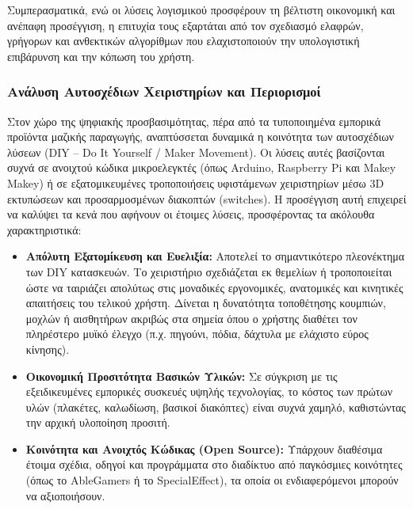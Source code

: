 \documentclass[twoside, a4paper, 11pt]{article}
\newcommand{\textlatin}[1]{\textenglish{#1}}
\begin{document}
Συμπερασματικά, ενώ οι λύσεις λογισμικού προσφέρουν τη βέλτιστη οικονομική και ανέπαφη προσέγγιση, η επιτυχία τους εξαρτάται από τον σχεδιασμό ελαφρών, γρήγορων και ανθεκτικών αλγορίθμων που ελαχιστοποιούν την υπολογιστική επιβάρυνση και την κόπωση του χρήστη.

\subsubsection{Ανάλυση Αυτοσχέδιων Χειριστηρίων και Περιορισμοί}

Στον χώρο της ψηφιακής προσβασιμότητας, πέρα από τα τυποποιημένα εμπορικά προϊόντα μαζικής παραγωγής, αναπτύσσεται δυναμικά η κοινότητα των αυτοσχέδιων λύσεων (\textlatin{DIY -- Do It Yourself / Maker Movement}). Οι λύσεις αυτές βασίζονται συχνά σε ανοιχτού κώδικα μικροελεγκτές (όπως \textlatin{Arduino, Raspberry Pi} και \textlatin{Makey Makey}) ή σε εξατομικευμένες τροποποιήσεις υφιστάμενων χειριστηρίων μέσω \textlatin{3D} εκτυπώσεων και προσαρμοσμένων διακοπτών (\textlatin{switches}). Η προσέγγιση αυτή επιχειρεί να καλύψει τα κενά που αφήνουν οι έτοιμες λύσεις, προσφέροντας τα ακόλουθα χαρακτηριστικά:

\begin{itemize}
    \item \textbf{Απόλυτη Εξατομίκευση και Ευελιξία:} Αποτελεί το σημαντικότερο πλεονέκτημα των \textlatin{DIY} κατασκευών. Το χειριστήριο σχεδιάζεται εκ θεμελίων ή τροποποιείται ώστε να ταιριάζει απολύτως στις μοναδικές εργονομικές, ανατομικές και κινητικές απαιτήσεις του τελικού χρήστη. Δίνεται η δυνατότητα τοποθέτησης κουμπιών, μοχλών ή αισθητήρων ακριβώς στα σημεία όπου ο χρήστης διαθέτει τον πληρέστερο μυϊκό έλεγχο (π.χ. πηγούνι, πόδια, δάχτυλα με ελάχιστο εύρος κίνησης).
    
    \item \textbf{Οικονομική Προσιτότητα Βασικών Υλικών:} Σε σύγκριση με τις εξειδικευμένες εμπορικές συσκευές υψηλής τεχνολογίας, το κόστος των πρώτων υλών (πλακέτες, καλωδίωση, βασικοί διακόπτες) είναι συχνά χαμηλό, καθιστώντας την αρχική υλοποίηση προσιτή.
    
    \item \textbf{Κοινότητα και Ανοιχτός Κώδικας (\textlatin{Open Source}):} Υπάρχουν διαθέσιμα έτοιμα σχέδια, οδηγοί και προγράμματα στο διαδίκτυο από παγκόσμιες κοινότητες (όπως το \textlatin{AbleGamers} ή το \textlatin{SpecialEffect}), τα οποία οι ενδιαφερόμενοι μπορούν να αξιοποιήσουν.
\end{itemize}
\end{document}
